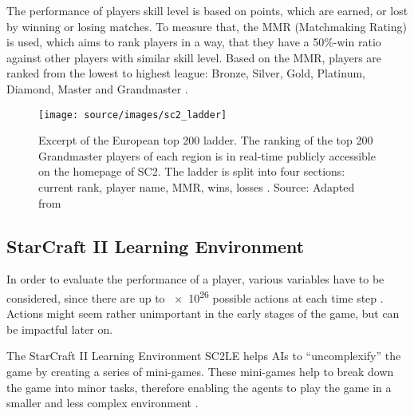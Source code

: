 The performance of players skill level is based on points, which are earned, or lost by winning or losing matches. To measure that, the MMR (Matchmaking Rating) is used, which aims to rank players in a way, that they have a 50\%-win ratio against other players with similar skill level. Based on the MMR, players are ranked from the lowest to highest league: Bronze, Silver, Gold, Platinum, Diamond, Master and Grandmaster \cite{liquipedia_mmr}. 
\begin{figure}[h]
 \centering
 \texttt{[image: source/images/sc2\_ladder]}
 \caption[Excerpt of the European top 200 ladder]{Excerpt of the European top 200 ladder. The ranking of the top 200 Grandmaster players of each region is in real-time publicly accessible on the homepage of SC2. The ladder is split into four sections: current rank, player name, MMR, wins, losses \protect\cite{blizzard_starcraft}. Source: Adapted from \protect\cite{blizzard_starcraft}}
 \label{fig:sc2_ladder}
\end{figure}

\subsection[head={SC2LE}, tocentry={StarCraft II Learning Environment}, reference={SC2LE}]{StarCraft II Learning Environment}\label{ssec:sc2le}
In order to evaluate the performance of a player, various variables have to be considered, since there are up to \num{e26} possible actions at each time step \cite{Vinyals2019}. Actions might seem rather unimportant in the early stages of the game, but can be impactful later on.

The StarCraft II Learning Environment SC2LE helps AIs to ``uncomplexify'' the game by creating a series of mini-games. These mini-games help to break down the game into minor tasks, therefore enabling the agents to play the game in a smaller and less complex environment \cite{2017arXiv170804782V}. 


